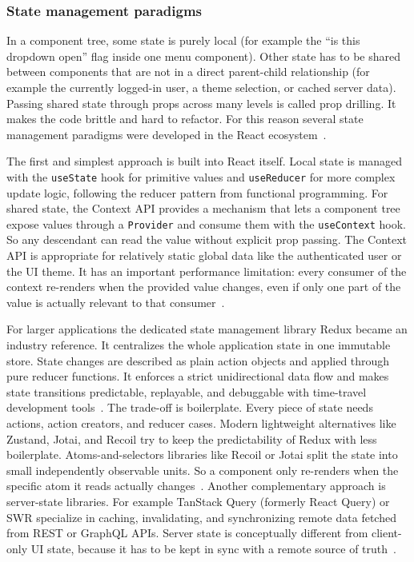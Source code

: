 \subsubsection{State management paradigms}
\label{subsec:state_management}

In a component tree, some state is purely local (for example the ``is this dropdown open'' flag inside one menu component). Other state has to be shared between components that are not in a direct parent-child relationship (for example the currently logged-in user, a theme selection, or cached server data). Passing shared state through props across many levels is called prop drilling. It makes the code brittle and hard to refactor. For this reason several state management paradigms were developed in the React ecosystem~\cite{goli2019react_hooks, putra2025api_react_laravel}.

The first and simplest approach is built into React itself. Local state is managed with the \texttt{useState} hook for primitive values and \texttt{useReducer} for more complex update logic, following the reducer pattern from functional programming. For shared state, the Context API provides a mechanism that lets a component tree expose values through a \texttt{Provider} and consume them with the \texttt{useContext} hook. So any descendant can read the value without explicit prop passing. The Context API is appropriate for relatively static global data like the authenticated user or the UI theme. It has an important performance limitation: every consumer of the context re-renders when the provided value changes, even if only one part of the value is actually relevant to that consumer~\cite{ameer_redux_context_2026, geeksforgeeks_state_mgmt_2025}.

For larger applications the dedicated state management library Redux became an industry reference. It centralizes the whole application state in one immutable store. State changes are described as plain action objects and applied through pure reducer functions. It enforces a strict unidirectional data flow and makes state transitions predictable, replayable, and debuggable with time-travel development tools~\cite{ameer_redux_context_2026}. The trade-off is boilerplate. Every piece of state needs actions, action creators, and reducer cases. Modern lightweight alternatives like Zustand, Jotai, and Recoil try to keep the predictability of Redux with less boilerplate. Atoms-and-selectors libraries like Recoil or Jotai split the state into small independently observable units. So a component only re-renders when the specific atom it reads actually changes~\cite{geeksforgeeks_state_mgmt_2025}. Another complementary approach is server-state libraries. For example TanStack Query (formerly React Query) or SWR specialize in caching, invalidating, and synchronizing remote data fetched from REST or GraphQL APIs. Server state is conceptually different from client-only UI state, because it has to be kept in sync with a remote source of truth~\cite{geeksforgeeks_state_mgmt_2025}.

